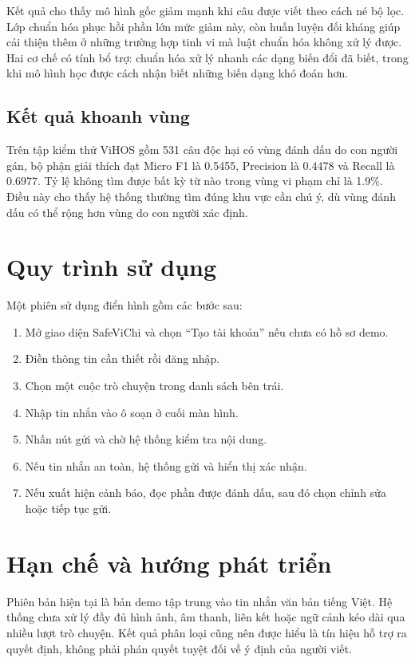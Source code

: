 \documentclass[12pt,a4paper]{article}
\begin{document}
Kết quả cho thấy mô hình gốc giảm mạnh khi câu được viết theo cách né bộ lọc. Lớp chuẩn hóa phục hồi phần lớn mức giảm này, còn huấn luyện đối kháng giúp cải thiện thêm ở những trường hợp tinh vi mà luật chuẩn hóa không xử lý được. Hai cơ chế có tính bổ trợ: chuẩn hóa xử lý nhanh các dạng biến đổi đã biết, trong khi mô hình học được cách nhận biết những biến dạng khó đoán hơn.

\subsection{Kết quả khoanh vùng}

Trên tập kiểm thử ViHOS gồm 531 câu độc hại có vùng đánh dấu do con người gán, bộ phận giải thích đạt Micro F1 là 0.5455, Precision là 0.4478 và Recall là 0.6977. Tỷ lệ không tìm được bất kỳ từ nào trong vùng vi phạm chỉ là 1.9\%. Điều này cho thấy hệ thống thường tìm đúng khu vực cần chú ý, dù vùng đánh dấu có thể rộng hơn vùng do con người xác định.

\section{Quy trình sử dụng}

Một phiên sử dụng điển hình gồm các bước sau:
\begin{enumerate}
    \item Mở giao diện SafeViChi và chọn ``Tạo tài khoản'' nếu chưa có hồ sơ demo.
    \item Điền thông tin cần thiết rồi đăng nhập.
    \item Chọn một cuộc trò chuyện trong danh sách bên trái.
    \item Nhập tin nhắn vào ô soạn ở cuối màn hình.
    \item Nhấn nút gửi và chờ hệ thống kiểm tra nội dung.
    \item Nếu tin nhắn an toàn, hệ thống gửi và hiển thị xác nhận.
    \item Nếu xuất hiện cảnh báo, đọc phần được đánh dấu, sau đó chọn chỉnh sửa hoặc tiếp tục gửi.
\end{enumerate}

\section{Hạn chế và hướng phát triển}

Phiên bản hiện tại là bản demo tập trung vào tin nhắn văn bản tiếng Việt. Hệ thống chưa xử lý đầy đủ hình ảnh, âm thanh, liên kết hoặc ngữ cảnh kéo dài qua nhiều lượt trò chuyện. Kết quả phân loại cũng nên được hiểu là tín hiệu hỗ trợ ra quyết định, không phải phán quyết tuyệt đối về ý định của người viết.
\end{document}
